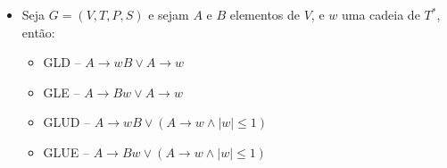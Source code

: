 \documentclass[12pt]{article}
\begin{document}
\begin{itemize}
\begin{itemize}
\begin{itemize}
\begin{itemize}
                \item Gramática Linear Unitária à Direita -- GLUD
                \item Gramática Linear Unitária à Esquerda -- GLUE
            \end{itemize}
            \item Seja $G = (V,T,P,S)$ e sejam $A$ e $B$ elementos de $V$, e 
            $w$ uma cadeia de $T^*$, então:
            \begin{itemize}
                \item GLD -- $A \rightarrow wB \vee A \rightarrow w$
                \item GLE -- $A \rightarrow Bw \vee A \rightarrow w$
                \item GLUD -- $A \rightarrow wB \vee (A \rightarrow w \wedge |w| 
                \leq 1)$
                \item GLUE -- $A \rightarrow Bw \vee (A \rightarrow w \wedge |w| 
                \leq 1)$
            \end{itemize}
        \end{itemize}
    \end{itemize}
\end{itemize}
\end{document}

